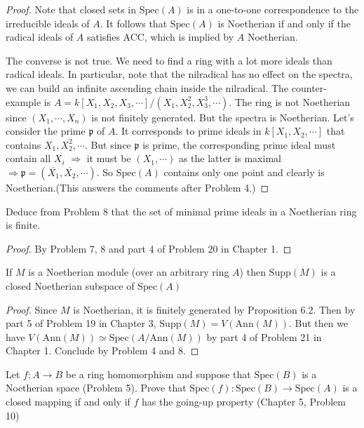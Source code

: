 \documentclass{solution}
\begin{document}
\begin{proof}
    Note that closed sets in $\mathrm{Spec}(A)$ is in a one-to-one correspondence to the irreducible ideals of $A$. It follows that $\mathrm{Spec}(A)$ is Noetherian if and only if the radical ideals of $A$ satisfies ACC, which is implied by $A$ Noetherian.

    The converse is not true. We need to find a ring with a lot more ideals than radical ideals. In particular, note that the nilradical has no effect on the spectra, we can build an infinite ascending chain inside the nilradical. The counter-example is $A = k[X_1, X_2, X_3, \cdots] / (X_1, X_2^2, X_3^3, \cdots)$. The ring is not Noetherian since $(X_1, \cdots, X_n)$ is not finitely generated. But the spectra is Noetherian. Let's consider the prime $\mathfrak{p}$ of $A$. It corresponds to prime ideals in $k[X_1, X_2, \cdots]$ that contains $X_1, X_2^2, \cdots$. But since $\mathfrak{p}$ is prime, the corresponding prime ideal must contain all $X_i$ $\Rightarrow$ it must be $(X_1, \cdots)$ as the latter is maximal $\Rightarrow \mathfrak{p} = (\overline{X_1}, \overline{X_2}, \cdots)$. So $\mathrm{Spec}(A)$ contains only one point and clearly is Noetherian.({\color{red}This answers the comments after Problem 4.})
\end{proof}

\begin{problem}
    Deduce from Problem 8 that the set of minimal prime ideals in a Noetherian ring is finite.
\end{problem}

\begin{proof}
    By Problem 7, 8 and part 4 of Problem 20 in Chapter 1.
\end{proof}

\begin{problem}
    If $M$ is a Noetherian module (over an arbitrary ring $A$) then $\mathrm{Supp}(M)$ is a closed Noetherian subspace of $\mathrm{Spec}(A)$
\end{problem}

\begin{proof}
    Since $M$ is Noetherian, it is finitely generated by Proposition 6.2. Then by part 5 of Problem 19 in Chapter 3, $\mathrm{Supp}(M) = V(\mathrm{Ann}(M))$. But then we have $V(\mathrm{Ann}(M)) \simeq \mathrm{Spec}(A / \mathrm{Ann}(M))$ by part 4 of Problem 21 in Chapter 1. Conclude by Problem 4 and 8.
\end{proof}

\begin{problem}
    Let $f: A \rightarrow B$ be a ring homomorphism and suppose that $\mathrm{Spec}(B)$ is a Noetherian space (Problem 5). Prove that $\mathrm{Spec}(f): \mathrm{Spec}(B) \rightarrow \mathrm{Spec}(A)$ is a closed mapping if and only if $f$ has the going-up property (Chapter 5, Problem 10)
\end{problem}
\end{document}
